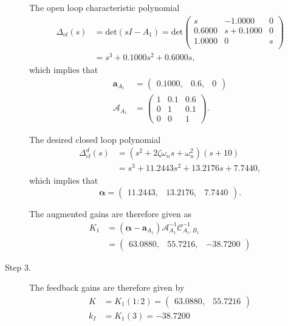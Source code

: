 \begin{description}
The open loop characteristic polynomial
\begin{align*}
\Delta_{ol}(s)&=\text{det}(sI-A_1) = \text{det}\begin{pmatrix} 
        s  &  -1.0000    &     0 \\
   0.6000  & s+0.1000    &     0 \\
   1.0000  &       0     &    s \\
\end{pmatrix} \\ &= s^3 + 0.1000s^2 + 0.6000 s,
\end{align*}
which implies that
\begin{align*}
\mathbf{a}_{A_1} &= \begin{pmatrix}0.1000, &        0.6,  &       0\end{pmatrix} \\
\mathcal{A}_{A_1} &= \begin{pmatrix} 
1 & 0.1 & 0.6 \\ 0 & 1 & 0.1 \\ 0 & 0 & 1
\end{pmatrix}.
\end{align*}

The desired closed loop polynomial
\begin{align*}
\Delta_{cl}^d(s) &= (s^2+2\zeta\omega_ns+\omega_n^2)(s+10)\\
&=s^3+11.2443s^2+13.2176s+7.7440,
\end{align*} 
which implies that
\[
\boldsymbol{\alpha} = \begin{pmatrix}11.2443, &   13.2176, &    7.7440\end{pmatrix}.
\]

The augmented gains are therefore given as
\begin{align*}
K_1 &= (\boldsymbol{\alpha}-\mathbf{a}_{A_1})\mathcal{A}_{A_1}^{-1}\mathcal{C}_{A_1,B_1}^{-1} \\
  &= \begin{pmatrix} 63.0880, &   55.7216, &  -38.7200 \end{pmatrix}
\end{align*}

\item[Step 3.]
The feedback gains are therefore given by
\begin{align*}
K &= K_1(1:2) = \begin{pmatrix} 63.0880, &   55.7216 \end{pmatrix} \\
k_I &= K_1(3) = -38.7200
\end{align*}

\end{description}


